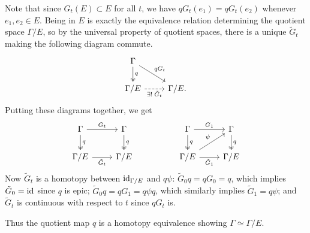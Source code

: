 \documentclass[twoside,10pt]{article}
\begin{document}
Note that since $G_t(E) \subset E$ for all $t$, we have $qG_t(e_1) = qG_t(e_2)$ whenever $e_1, e_2 \in E$. Being in $E$ is exactly the equivalence relation determining the quotient space $\Gamma/E$, so by the universal property of quotient spaces, there is a unique $\tilde{G}_t$ making the following diagram commute.
\[
\begin{tikzcd}
	\Gamma \dar[two heads]{q} \arrow[dr, "qG_t"] \\
	\Gamma/E \rar[dashed, "\exists!\;\tilde{G}_t"'] & \Gamma/E.
\end{tikzcd}
\] 
Putting these diagrams together, we get
\[
\begin{tikzcd}
	\Gamma\dar[two heads]{q}\rar{G_t} & \Gamma \dar[two heads]{q} & & \Gamma \dar[two heads]{q}\rar{G_1} & \Gamma \dar[two heads]{q} \\
	\Gamma/E \rar["\tilde{G}_t"'] & \Gamma/E & & \Gamma/E \rar["\tilde{G}_1"']\arrow[ur,"\psi"] & \Gamma/E
\end{tikzcd}
\] Now $\tilde{G}_t$ is a homotopy between $\operatorname{id}_{\Gamma/E}$ and $q\psi$: $\tilde{G}_0 q = q G_0 = q$, which implies $\tilde{G}_0=\operatorname{id}_{}$ since $q$ is epic; $\tilde{G}_0q =qG_1=q\psi q$, which similarly implies $\tilde{G}_1 = q\psi$; and $\tilde{G}_t$ is continuous with respect to $t$ since $q G_t$ is.

Thus the quotient map $q$ is a homotopy equivalence showing $\Gamma \simeq \Gamma/E$.
\end{document}
